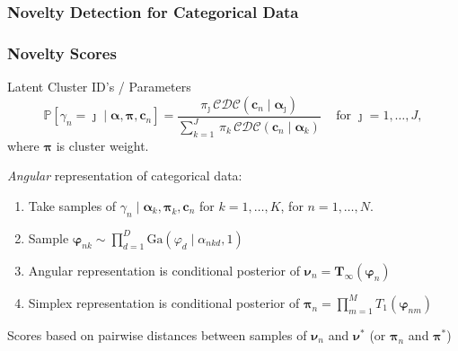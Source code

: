 \documentclass[aspectratio=169,10pt,notes]{beamer}
\begin{document}
\subsubsection{Novelty Detection for Categorical Data}

\begin{frame}
    \frametitle{Novelty Scores}
    \label{ndpg:noveltyscores}
    Latent Cluster ID's / Parameters
        \[
        \mathbb{P}[\gamma_n = \jmath\mid \bm{\alpha}, \bm{\pi}, \bm{c}_n] = 
        \frac{
            \pi_{\jmath}\,\mathcal{CDC}\left(\bm{c}_n\mid\bm{\alpha}_{\jmath}\right)
            }{
            \sum_{k = 1}^J\,\pi_k\,\mathcal{CDC}\left(\bm{c}_n\mid\bm{\alpha}_k\right)
            }
            \;\;\;\text{ for }\jmath = 1, \ldots, J,
        \]
    where $\bm{\pi}$ is cluster weight.
    
    \emph{Angular} representation of categorical data:
        \begin{enumerate}
            \item Take samples of $\gamma_n\mid \bm{\alpha}_k,\bm{\pi}_k,\bm{c}_n$ for $k = 1,\ldots,K$, for $n = 1,\ldots, N$.
            \item Sample $\bm{\varphi}_{nk}\sim \prod_{d = 1}^D\text{Ga}(\varphi_d\mid\alpha_{nkd},1)$
            \item Angular representation is conditional posterior of $\bm{\nu}_n = \bm{T}_{\infty}(\bm{\varphi}_n)$
            \item Simplex representation is conditional posterior of $\bm{\pi}_n = \prod_{m = 1}^MT_1(\bm{\varphi}_{nm})$
        \end{enumerate}
    Scores based on pairwise distances between samples of $\bm{\nu}_n$ and $\bm{\nu}^*$ (or $\bm{\pi}_n$ and $\bm{\pi}^*$)
    \hyperlink{ndpg:noveltyscoresdetail}{}
\end{frame} %
\end{document}
